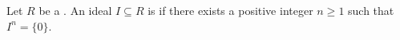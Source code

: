\begin{definition} \label{definition:nilpotent_ideal_of_a_ring}
Let $R$ be a .
An ideal $I \subseteq R$ is  if there exists a positive integer $n \geq 1$ such that $I^n = \{0\}$.
\end{definition}